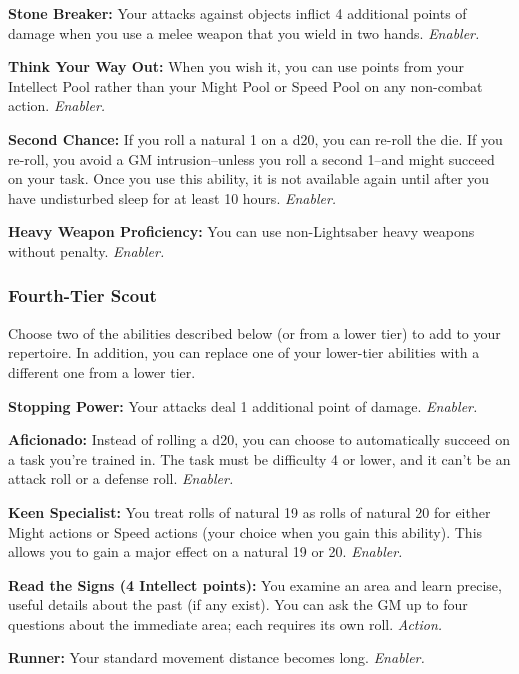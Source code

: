 \documentclass[a4paper,10pt,final,twocolumn,oneside]{book}
\newcommand{\itemAbility}[2]{\textcolor{25gray}{\textbullet\textbf{ #1:}}{ #2}\par}
\newcommand{\enabler}{\textit{ Enabler.}}
\newcommand{\action}{\textit{ Action.}}
\begin{document}
\itemAbility{Stone Breaker}{Your attacks against objects inflict 4 additional points of damage when you use a melee weapon that you wield in two hands.\enabler}

\itemAbility{Think Your Way Out}{When you wish it, you can use points from your Intellect Pool rather than your Might Pool or Speed Pool on any non-combat action.\enabler}

\itemAbility{Second Chance}{If you roll a natural 1 on a d20, you can re-roll the die. If you re-roll, you avoid a GM intrusion--unless you roll a second 1--and might succeed on your task. Once you use this ability, it is not available again until after you have undisturbed sleep for at least 10 hours.\enabler}

\itemAbility{Heavy Weapon Proficiency}{You can use non-Lightsaber heavy weapons without penalty.\enabler}


\subsubsection*{Fourth-Tier Scout}
\label{subsub:scoutFourthTier}

Choose two of the abilities described
below (or from a lower tier) to add to your
repertoire. In addition, you can replace one
of your lower-tier abilities with a different
one from a lower tier.

\itemAbility{Stopping Power}{Your attacks deal 1 additional point of damage.\enabler}

\itemAbility{Aficionado}{Instead of rolling a d20, you can choose to automatically succeed on a task you’re trained in. The task must be difficulty 4 or lower, and it can’t be an attack roll or a defense roll.\enabler}

\itemAbility{Keen Specialist}{You treat rolls of natural 19 as rolls of natural 20 for either Might actions or Speed actions (your choice when you gain this ability). This allows you to gain a major effect on a natural 19 or 20.\enabler}

\itemAbility{Read the Signs (4 Intellect points)}{You examine an area and learn precise, useful details about the past (if any exist). You can ask the GM up to four questions about the immediate area; each requires its own roll.\action}

\itemAbility{Runner}{Your standard movement distance becomes long.\enabler}
\end{document}
